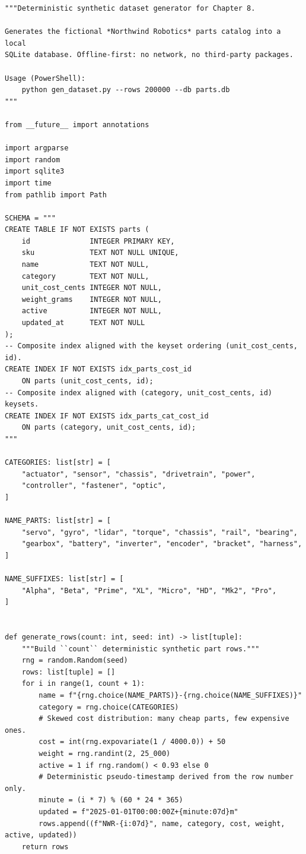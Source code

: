 \begin{verbatim}
"""Deterministic synthetic dataset generator for Chapter 8.

Generates the fictional *Northwind Robotics* parts catalog into a local
SQLite database. Offline-first: no network, no third-party packages.

Usage (PowerShell):
    python gen_dataset.py --rows 200000 --db parts.db
"""

from __future__ import annotations

import argparse
import random
import sqlite3
import time
from pathlib import Path

SCHEMA = """
CREATE TABLE IF NOT EXISTS parts (
    id              INTEGER PRIMARY KEY,
    sku             TEXT NOT NULL UNIQUE,
    name            TEXT NOT NULL,
    category        TEXT NOT NULL,
    unit_cost_cents INTEGER NOT NULL,
    weight_grams    INTEGER NOT NULL,
    active          INTEGER NOT NULL,
    updated_at      TEXT NOT NULL
);
-- Composite index aligned with the keyset ordering (unit_cost_cents, id).
CREATE INDEX IF NOT EXISTS idx_parts_cost_id
    ON parts (unit_cost_cents, id);
-- Composite index aligned with (category, unit_cost_cents, id) keysets.
CREATE INDEX IF NOT EXISTS idx_parts_cat_cost_id
    ON parts (category, unit_cost_cents, id);
"""

CATEGORIES: list[str] = [
    "actuator", "sensor", "chassis", "drivetrain", "power",
    "controller", "fastener", "optic",
]

NAME_PARTS: list[str] = [
    "servo", "gyro", "lidar", "torque", "chassis", "rail", "bearing",
    "gearbox", "battery", "inverter", "encoder", "bracket", "harness",
]

NAME_SUFFIXES: list[str] = [
    "Alpha", "Beta", "Prime", "XL", "Micro", "HD", "Mk2", "Pro",
]


def generate_rows(count: int, seed: int) -> list[tuple]:
    """Build ``count`` deterministic synthetic part rows."""
    rng = random.Random(seed)
    rows: list[tuple] = []
    for i in range(1, count + 1):
        name = f"{rng.choice(NAME_PARTS)}-{rng.choice(NAME_SUFFIXES)}"
        category = rng.choice(CATEGORIES)
        # Skewed cost distribution: many cheap parts, few expensive ones.
        cost = int(rng.expovariate(1 / 4000.0)) + 50
        weight = rng.randint(2, 25_000)
        active = 1 if rng.random() < 0.93 else 0
        # Deterministic pseudo-timestamp derived from the row number only.
        minute = (i * 7) % (60 * 24 * 365)
        updated = f"2025-01-01T00:00:00Z+{minute:07d}m"
        rows.append((f"NWR-{i:07d}", name, category, cost, weight, active, updated))
    return rows



\end{verbatim}
